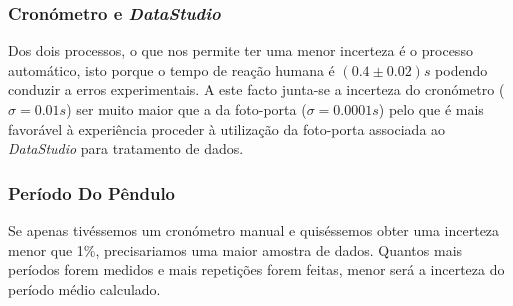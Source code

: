 \documentclass{beamer}
\begin{document}

\begin{frame}
			\frametitle{Cronómetro e \textit{DataStudio}}
		Dos dois processos, o que nos permite ter uma menor incerteza é o processo automático, isto porque o tempo de reação humana é $(0.4\pm0.02)s$ podendo conduzir a erros experimentais. A este facto junta-se a incerteza do cronómetro ($\sigma=0.01s$) ser muito maior que a da foto-porta ($\sigma=0.0001s$) pelo que é mais favorável à experiência proceder à utilização da foto-porta associada ao \textit{DataStudio} para tratamento de dados.	
\end{frame}

\begin{frame}
	\frametitle{Período Do Pêndulo}
	Se apenas tivéssemos um cronómetro manual e quiséssemos obter uma incerteza menor que 1\%, precisariamos uma maior amostra de dados. Quantos mais períodos forem medidos e mais repetições forem feitas, menor será a incerteza do período médio calculado.
\end{frame}
\end{document}
